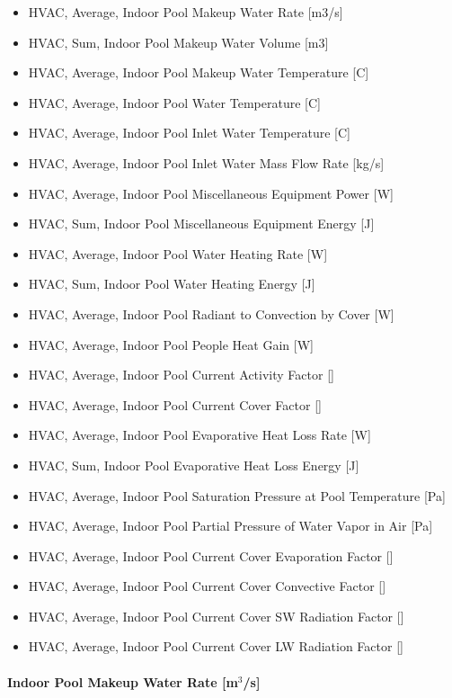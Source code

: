 \begin{itemize}
\tightlist
\item
  HVAC, Average, Indoor Pool Makeup Water Rate {[}m3/s{]}
\item
  HVAC, Sum, Indoor Pool Makeup Water Volume {[}m3{]}
\item
  HVAC, Average, Indoor Pool Makeup Water Temperature {[}C{]}
\item
  HVAC, Average, Indoor Pool Water Temperature {[}C{]}
\item
  HVAC, Average, Indoor Pool Inlet Water Temperature {[}C{]}
\item
  HVAC, Average, Indoor Pool Inlet Water Mass Flow Rate {[}kg/s{]}
\item
  HVAC, Average, Indoor Pool Miscellaneous Equipment Power {[}W{]}
\item
  HVAC, Sum, Indoor Pool Miscellaneous Equipment Energy {[}J{]}
\item
  HVAC, Average, Indoor Pool Water Heating Rate {[}W{]}
\item
  HVAC, Sum, Indoor Pool Water Heating Energy {[}J{]}
\item
  HVAC, Average, Indoor Pool Radiant to Convection by Cover {[}W{]}
\item
  HVAC, Average, Indoor Pool People Heat Gain {[}W{]}
\item
  HVAC, Average, Indoor Pool Current Activity Factor {[]}
\item
  HVAC, Average, Indoor Pool Current Cover Factor {[]}
\item
  HVAC, Average, Indoor Pool Evaporative Heat Loss Rate {[}W{]}
\item
  HVAC, Sum, Indoor Pool Evaporative Heat Loss Energy {[}J{]}
\item
  HVAC, Average, Indoor Pool Saturation Pressure at Pool Temperature {[}Pa{]}
\item
  HVAC, Average, Indoor Pool Partial Pressure of Water Vapor in Air {[}Pa{]}
\item
  HVAC, Average, Indoor Pool Current Cover Evaporation Factor {[]}
\item
  HVAC, Average, Indoor Pool Current Cover Convective Factor {[]}
\item
  HVAC, Average, Indoor Pool Current Cover SW Radiation Factor {[]}
\item
  HVAC, Average, Indoor Pool Current Cover LW Radiation Factor {[]}
\end{itemize}

\paragraph{Indoor Pool Makeup Water Rate {[}m\(^{3}\)/s{]}}\label{indoor-pool-makeup-water-rate-m3s}

